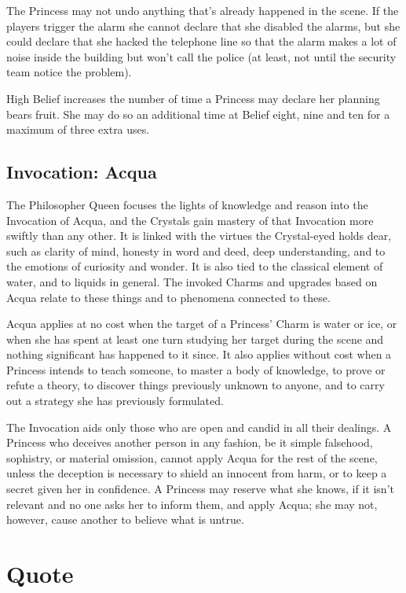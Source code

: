 The Princess may not undo anything that's already happened in the scene. If the players trigger the alarm she cannot declare that she disabled the alarms, but she could declare that she hacked the telephone line so that the alarm makes a lot of noise inside the building but won't call the police (at least, not until the security team notice the problem).

High Belief increases the number of time a Princess may declare her planning bears fruit. She may do so an additional time at Belief eight, nine and ten for a maximum of three extra uses. 
\subsection*{Invocation: Acqua}
The Philosopher Queen focuses the lights of knowledge and reason into the Invocation of Acqua, and the Crystals gain mastery of that Invocation more swiftly than any other. It is linked with the virtues the Crystal-eyed holds dear, such as clarity of mind, honesty in word and deed, deep understanding, and to the emotions of curiosity and wonder. It is also tied to the classical element of water, and to liquids in general. The invoked Charms and upgrades based on Acqua relate to these things and to phenomena connected to these.

Acqua applies at no cost when the target of a Princess' Charm is water or ice, or when she has spent at least one turn studying her target during the scene and nothing significant has happened to it since. It also applies without cost when a Princess intends to teach someone, to master a body of knowledge, to prove or refute a theory, to discover things previously unknown to anyone, and to carry out a strategy she has previously formulated.

The Invocation aids only those who are open and candid in all their dealings. A Princess who deceives another person in any fashion, be it simple falsehood, sophistry, or material omission, cannot apply Acqua for the rest of the scene, unless the deception is necessary to shield an innocent from harm, or to keep a secret given her in confidence. A Princess may reserve what she knows, if it isn't relevant and no one asks her to inform them, and apply Acqua; she may not, however, cause another to believe what is untrue.

\section*{Quote}

